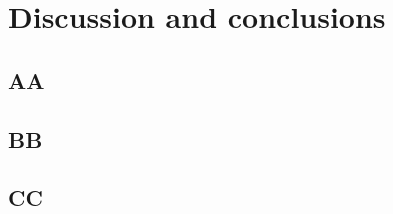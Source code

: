 \chapter{Discussion and conclusions}

\section{AA}
\lipsum[2]

\section{BB}
\lipsum[2]

\section{CC}
\lipsum[2]

